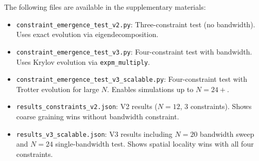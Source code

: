\documentclass[11pt]{article}
\begin{document}
The following files are available in the supplementary materials:

\begin{itemize}
    \item \texttt{constraint\_emergence\_test\_v2.py}: Three-constraint test (no bandwidth). 
    Uses exact evolution via eigendecomposition.
    
    \item \texttt{constraint\_emergence\_test\_v3.py}: Four-constraint test with bandwidth. 
    Uses Krylov evolution via \texttt{expm\_multiply}.
    
    \item \texttt{constraint\_emergence\_test\_v3\_scalable.py}: Four-constraint 
    test with Trotter evolution for large $N$. Enables simulations up to $N=24+$.
    
    \item \texttt{results\_constraints\_v2.json}: V2 results ($N=12$, 3 constraints). 
    Shows coarse graining wins without bandwidth constraint.
    
    \item \texttt{results\_v3\_scalable.json}: V3 results including $N=20$ bandwidth 
    sweep and $N=24$ single-bandwidth test. Shows spatial locality wins with all 
    four constraints.
\end{itemize}
\end{document}
